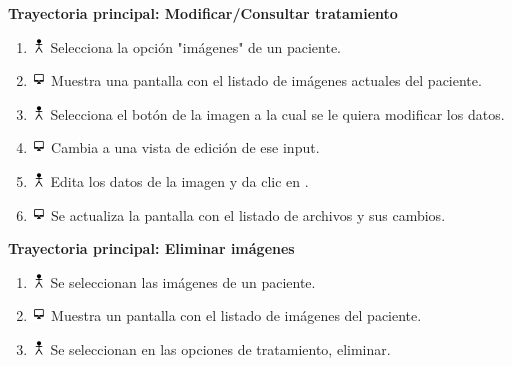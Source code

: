 \textbf{Trayectoria principal: Modificar/Consultar tratamiento}        
\begin{enumerate}
\item \includegraphics[height=1em]{pictures/actor.png} Selecciona la opción "imágenes" de un paciente.
\item \includegraphics[height=1em]{pictures/sistema.png} Muestra una pantalla con el listado de imágenes actuales del paciente.
\item \includegraphics[height=1em]{pictures/actor.png} Selecciona el botón  de la imagen a la cual se le quiera modificar los datos.
\item \includegraphics[height=1em]{pictures/sistema.png} Cambia a una vista de edición de ese input.
\item \includegraphics[height=1em]{pictures/actor.png} Edita los datos de la imagen y da clic en .
\item \includegraphics[height=1em]{pictures/sistema.png} Se actualiza la pantalla con el listado de archivos y sus cambios.
\end{enumerate} \bigskip

\textbf{Trayectoria principal: Eliminar imágenes}  
\begin{enumerate}
\item \includegraphics[height=1em]{pictures/actor.png} Se seleccionan las imágenes de un paciente.
\item \includegraphics[height=1em]{pictures/sistema.png} Muestra un pantalla con el listado de imágenes del paciente.
\item \includegraphics[height=1em]{pictures/actor.png} Se seleccionan en las opciones de tratamiento, eliminar.
\end{enumerate} \bigskip


